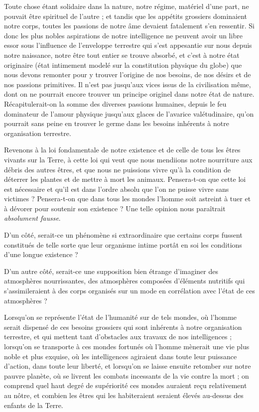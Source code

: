 \documentclass[a4paper, 11pt, oneside, landscape]{article}
\begin{document}
Toute chose étant solidaire dans la nature, notre régime, matériel d'une part, ne pouvait être spirituel de l'autre ; et tandis que les appétits grossiers dominaient notre corps, toutes les passions de notre âme devaient fatalement s'en ressentir. Si donc les plus nobles aspirations de notre intelligence ne peuvent avoir un libre essor sous l'influence de l'enveloppe terrestre qui s'est appesantie sur nous depuis notre naissance, notre être tout entier se trouve absorbé, et c'est à notre état originaire (état intimement modelé sur la constitution physique du globe) que nous devons remonter pour y trouver l'origine de nos besoins, de nos désirs et de nos passions primitives. Il n'est pas jusqu'aux vices issus de la civilisation même, dont on ne pourrait encore trouver un principe originel dans notre état de nature. Récapitulerait-on la somme des diverses passions humaines, depuis le feu dominateur de l'amour physique jusqu'aux glaces de l'avarice valétudinaire, qu'on pourrait sans peine en trouver le germe dans les besoins inhérents à notre organisation terrestre.

Revenons à la loi fondamentale de notre existence et de celle de tous les êtres vivants sur la Terre, à cette loi qui veut que nous mendiions notre nourriture aux débris des autres êtres, et que nous ne puissions vivre qu'à la condition de déterrer les plantes et de mettre à mort les animaux. Pensera-t-on que cette loi est nécessaire et qu'il est dans l'ordre absolu que l'on ne puisse vivre sans victimes ? Pensera-t-on que dans tous les mondes l'homme soit astreint à tuer et à dévorer pour soutenir son existence ? Une telle opinion nous paraîtrait \emph{absolument fausse}.

D'un côté, serait-ce un phénomène si extraordinaire que certains corps fussent constitués de telle sorte que leur organisme intime portât en soi les conditions d'une longue existence ?

D'un autre côté, serait-ce une supposition bien étrange d'imaginer des atmosphères nourrissantes, des atmosphères composées d'éléments nutritifs qui s'assimileraient à des corps organisés sur un mode en corrélation avec l'état de ces atmosphères ?

Lorsqu'on se représente l'état de l'humanité sur de tels mondes, où l'homme serait dispensé de ces besoins grossiers qui sont inhérents à notre organisation terrestre, et qui mettent tant d'obstacles aux travaux de nos intelligences ; lorsqu'on se transporte à ces mondes fortunés où l'homme mènerait une vie plus noble et plus exquise, où les intelligences agiraient dans toute leur puissance d'action, dans toute leur liberté, et lorsqu'on se laisse ensuite retomber sur notre pauvre planète, où se livrent les combats incessants de la vie contre la mort ; on comprend quel haut degré de supériorité ces mondes auraient reçu relativement au nôtre, et combien les êtres qui les habiteraient seraient élevés au-dessus des enfants de la Terre.
\end{document}
